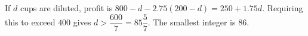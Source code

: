If $d$ cups are diluted, profit is $800-d-2.75(200-d)=250+1.75d$. Requiring this to exceed $400$ gives $d>\dfrac{600}{7}=85\dfrac{5}{7}$. The smallest integer is $\boxed{86}$.
